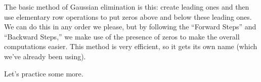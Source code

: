 

The basic method of Gaussian elimination is this: create leading ones and then use elementary row operations to put zeros above and below these leading ones. We can do this in any order we please, but by following the ``Forward Steps'' and ``Backward Steps,'' we make use of the presence of zeros to make the overall computations easier. This method is very efficient, so it gets its own name (which we've already been using).

\smallskip


\smallskip

Let's practice some more.\\

\medskip

